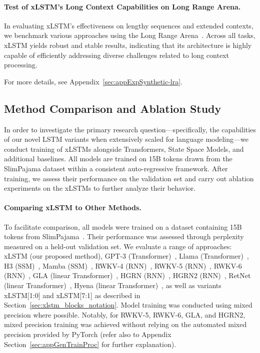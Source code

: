 \paragraph{Test of xLSTM's Long Context Capabilities on Long Range Arena.} In evaluating xLSTM's effectiveness on lengthy sequences and extended contexts, we benchmark various approaches using the Long Range Arena~\citep{Tay:21}. Across all tasks, xLSTM yields robust and stable results, indicating that its architecture is highly capable of efficiently addressing diverse challenges related to long context processing.

For more details, see Appendix~\ref{sec:appExpSynthetic-lra}.

\subsection{Method Comparison and Ablation Study}
\label{sec:ExpComparison}

In order to investigate the primary research question—specifically, the capabilities of our novel LSTM variants when extensively scaled for language modeling—we conduct training of xLSTMs alongside Transformers, State Space Models, and additional baselines. All models are trained on 15B tokens drawn from the SlimPajama dataset within a consistent auto-regressive framework. After training, we assess their performance on the validation set and carry out ablation experiments on the xLSTMs to further analyze their behavior.

\paragraph{Comparing xLSTM to Other Methods.} To facilitate comparison, all models were trained on a dataset containing 15B tokens from SlimPajama~\citep{Soboleva:23}. Their performance was assessed through perplexity measured on a held-out validation set. We evaluate a range of approaches: xLSTM (our proposed method), GPT-3 (Transformer)~\citep{Brown:20short}, Llama (Transformer)~\citep{Touvron:23arxiv}, H3 (SSM)~\citep{Fu:23}, Mamba (SSM)~\citep{Gu:24arxiv}, RWKV-4 (RNN)~\citep{Peng:23arxivshort}, RWKV-5 (RNN)~\citep{Peng:24arxivshort}, RWKV-6 (RNN)~\citep{Peng:24arxivshort}, GLA (linear Transformer)~\citep{Yang:23arxiv}, HGRN (RNN)~\citep{Qin:23}, HGRN2 (RNN)~\citep{Qin:24arxiv}, RetNet (linear Transformer)~\citep{Sun:23arxiv}, Hyena (linear Transformer)~\citep{Poli:23}, as well as variants xLSTM[1:0] and xLSTM[7:1] as described in Section~\ref{sec:xlstm_blocks_notation}. Model training was conducted using mixed precision where possible. Notably, for RWKV-5, RWKV-6, GLA, and HGRN2, mixed precision training was achieved without relying on the automated mixed precision provided by PyTorch (refer also to Appendix Section~\ref{sec:appGenTrainProc} for further explanation).

